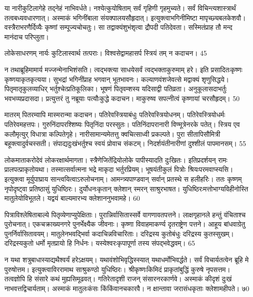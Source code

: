 या नारीकुटिलागेहे तद्नेहं नाभिवर्धते।
नश्येत्कुयोषिताम् सर्वं गृहिणी गृहमुच्यते।
सर्वं विचिन्त्यशास्त्रार्थं तत्वबध्यवधारणात्।
अस्माकं भगिनींबाला संयक्पालयसौहृदात्।
इत्युक्त्वाभगिनीमिष्टा मापृच्छ्यबलकेशवौ।
वस्त्रैराभरणैर्दिव्यैः कृष्णां सम्पूज्यचोचतुः।
सा तद्वाक्यंशुभंशृत्वा द्रौपदी पतिदेवता।
सस्मितंप्राह तौ मन्द मानंदाच परिप्लुता।

लोकेसाधरणम् नार्यः कुटिलास्वार्थ तत्पराः।
विश्वसेद्वामहासर्प स्त्रियं तम् न कदाचन।
45

न तथाब्रूहिमामार्य मज्जन्मेनाभिशंसति।
त्वद्भक्त्या साधयेसर्वं त्वद्भक्ताकुरुमाम् हरे।
इति प्रसादितःकृष्णः कृष्णयाकृतकृत्यया।
सुभद्रां भगिनींप्राह भगवान् भूतभावनः।
कल्याणवंशजेवत्से मद्वाक्यं शृणुसिद्धये।
पितृमातृकुलव्याधिर् भर्तुश्चेत्प्रतिकूलिका।
भूषणं पितृवम्शस्य यदिसाद्वी पतिव्रता।
अनुकूलासदाभर्तुः भवभव्यप्रदासदा।
प्रत्युत्तरं तु नब्रूयाः पत्यौःकुद्धे कदाचन।
माकुरुष्व सपत्नीत्वं कृष्णायां चरसौहृदम्।
50

मातरम् पितरम्वापि मास्मरान्मा कदाचन।
पतिरेवस्त्रियाबंधुः पतिरेवस्त्रियोधनम्।
पतिरेवस्त्रियोधर्मः पतिरेवमहत्तपः।
गुरुनिंदापरश्शिष्यः पितृनिंदा परस्सुतः।
पतिनिंदापरानारी विण्मूत्रेनरके पतेत्।
स्त्रिय एव कलौमृत्युर् विधात्रा कल्पितेगृहे।
नारीसामान्यमेतत्तु क्वचित्साध्वी प्रकल्पते।
पुरा सीतापिसौमित्री बहूक्त्वादुर्वचस्सती।
संपाद्यदुःखंभर्तुश्च स्वयं प्रोवाच संकटम्।
निदर्शयंतीनारीणां दुश्शीलं पापमानसम्।
55


लोकमाताकरोदेवं लोकरक्षार्थमागता।
स्त्रैणेजितेंद्रियोलोके पापीस्यादति दुःखितः।
इतिप्रदर्शयन् रामः प्रालपत्प्राकृतोयथा।
तस्मात्सर्वात्मना भद्रे माकृदा भर्तुरप्रियम्।
भूषयंतीकुलं पित्रोः श्रियःपरमवाप्स्यसि।
इत्युक्त्वा मूर्युपाघ्राय सान्त्वयित्वाऽरुलोचनाम्।
आमन्त्र्यपाण्डवान् सर्वान् प्रतस्थे स हलीहरिः।
ततः कृष्णम् नृपोदृष्ट्वा प्रतिष्ठासुं युधिष्ठिरः।
दुर्योधनःकृतान् क्लेशान् स्मरन् साश्रुरभाषत।
युधिष्ठिरःमत्तोभाग्यविहीनोस्ति मातुलेयोविभूतले।
यद्वयं बाल्यमारभ्य क्लेशाननुभवामहे।
60

पित्राविश्लेषिताबाल्ये पितृव्येणाप्युपेक्षिताः।
पुरान्निर्वासितास्सर्वे वागणावतपत्तने।
लाक्षगृहानले हन्तुं वंचिताश्च पुरोचनात्।
एकचक्राख्यनगरे पुनर्भेक्ष्यैक जीवनाः।
कृष्णा विवाहमाकर्ण्य दृतराष्ट्रेण पत्तने।
आहूय बांधवाग्रेतु पुनर्निर्वासितावयम्।
मातुलेनभवद्भिर्वा कदाचिन्नविचारिताः।
दरिद्रस्य कुतोबंधुः दरिद्रस्य कुतस्सुखम्।
दरिद्रस्यकुतो धर्मो मृतप्रायो हि निर्धनः।
यस्येश्वरःकृपापूर्णा तस्य संपद्भवेद्धवम्।
65


न यथा शत्रुबाधास्याद्यथैश्वर्यं हरेऽक्षयम्।
यथावंशोभिवृद्धिस्स्यात् यथाधर्मोभिवर्द्धते।
सर्वं विचार्यतत्वेन ब्रूहि मे पुरुषोत्तम।
इत्युक्त्वाविररामाथ साश्रुकण्ठो युधिष्ठिरः।
श्रीकृष्णःकिमिदं प्राकृतांबुद्धिं कुरुषे नृपसत्तम।
तत्वज्ञोपि हि संसारे कथं मुह्यसिमूढवत्।
गतिरेतादृशी राजन् संसारनरकार्णवे।
अस्माकं कीदृशं दुःखं नाभवत्तद्विचार्यताम्।
अस्माकं मातुलःकंसः किंकिंवानचकारवै।
न क्षान्तावा जरासंधकृताः क्लेशामहीपते।
७0

